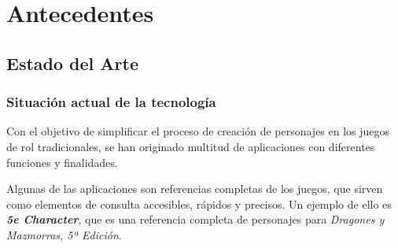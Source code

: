 


\chapter{Antecedentes}
\thispagestyle{chapterpage}

\section{Estado del Arte}

\subsection{Situación actual de la tecnología}
Con el objetivo de simplificar el proceso de creación de 
personajes en los juegos de rol tradicionales, se han originado 
multitud de aplicaciones con diferentes funciones y finalidades.

Algunas de las aplicaciones son referencias completas de 
los juegos, que sirven como elementos de consulta accesibles, 
rápidos y precisos. Un ejemplo de ello es \textit{\textbf{5e Character}},
que es una referencia completa de personajes para \textit{Dragones y 
Mazmorras, 5ª Edición}.\bigskip

